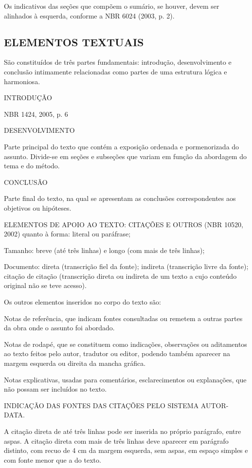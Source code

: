 Os indicativos das seções que compõem o sumário, se houver, devem ser
alinhados à esquerda, conforme a NBR 6024 (2003, p. 2). 

\subsection{ELEMENTOS TEXTUAIS}

São constituídos de três partes fundamentais: introdução,
desenvolvimento e conclusão intimamente relacionadas como partes de uma estrutura lógica e
harmoniosa. 

INTRODUÇÃO 

NBR 1424, 2005, p. 6

DESENVOLVIMENTO 

Parte principal do texto que contém a exposição ordenada e pormenorizada do assunto.
Divide-se em seções e subseções que variam em função da abordagem do tema e do método. 

CONCLUSÃO 

Parte final do texto, na qual se apresentam as conclusões correspondentes aos objetivos
ou hipóteses. 

ELEMENTOS DE APOIO AO TEXTO: CITAÇÕES E OUTROS (NBR 10520, 2002) 
quanto à forma: literal ou paráfrase;

Tamanho: breve (até três linhas) e longo (com mais de três linhas);

Documento: direta (transcrição fiel da fonte); indireta (transcrição livre da fonte); citação de citação (transcrição direta ou indireta de um texto a cujo conteúdo original não se teve acesso). 

Os outros elementos inseridos no corpo do texto são:

Notas de referência, que indicam fontes consultadas ou remetem a outras partes da obra onde o assunto foi abordado.

Notas de rodapé, que se constituem como indicações, observações ou aditamentos ao texto feitos pelo autor, tradutor ou editor, podendo também aparecer na margem esquerda ou direita da mancha gráfica.

 Notas explicativas, usadas para comentários, esclarecimentos ou explanações, que não possam ser incluídos no texto. 

INDICAÇÃO DAS FONTES DAS CITAÇÕES PELO SISTEMA AUTOR-DATA.

A citação direta de até três linhas pode ser inserida no
próprio parágrafo, entre aspas. A citação direta com mais de três linhas deve aparecer em parágrafo distinto, com recuo de 4 cm da margem esquerda, sem aspas, em espaço simples e com fonte menor que a do texto.


